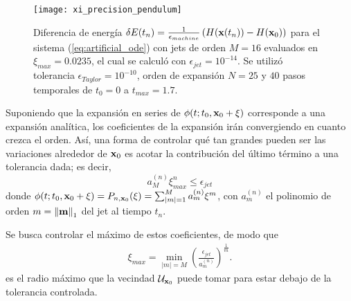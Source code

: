 \begin{figure}[h!]
	\centering
	\texttt{[image: xi\_precision\_pendulum]}
	\caption{Diferencia de energía $\delta E(t_n) = \frac{1}{\epsilon_{machine}} \left( H(\mathbf{x}(t_n)) - H(\mathbf{x}_0) \right)$ para el sistema (\ref{eq:artificial_ode}) con jets de orden $M=16$ evaluados en $\xi_{max} = 0.0235$, el cual se calculó con $\epsilon_{jet} = 10^{-14}$. Se utilizó tolerancia $\epsilon_{Taylor} = 10^{-10}$, orden de expansión $N = 25$ y $40$ pasos temporales de $t_0 = 0$ a $t_{max} = 1.7$.}
	\label{fig:xi_precision_pendulum}
\end{figure}


Suponiendo que la expansión en series de $\phi(t;t_0,\mathbf{x}_0 + \xi)$ corresponde a una expansión analítica, los coeficientes de la expansión irán convergiendo en cuanto crezca el orden. Así, una forma de controlar qué tan grandes pueden ser las variaciones alrededor de $\mathbf{x}_0$ es acotar la contribución del último término a una tolerancia dada; es decir,
\begin{equation*}
 a_{M}^{(n)}\xi_{max}^n \leq \epsilon_{jet}
\end{equation*}
donde $\phi(t;t_0,\mathbf{x}_0 + \xi) = P_{n,\mathbf{x}_0}(\xi) = \sum_{|m|=1}^M  a_{m}^{(n)} \xi^m$, con $a_{m}^{(n)}$ el polinomio de orden $m = \left\lVert\mathbf{m}\right\rVert_1$ del jet al tiempo $t_n$.

Se busca controlar el máximo de estos coeficientes, de modo que 
\begin{align}
 \xi_{max} = \min_{|m|=M} \left( \frac{\epsilon_{jet}}{a_{m}^{(n)}} \right)^{\frac{1}{m}}.
\end{align}
es el radio máximo que la vecindad $\mathcal{U}_{\mathbf{x}_0}$ puede tomar para estar debajo de la tolerancia controlada. 

